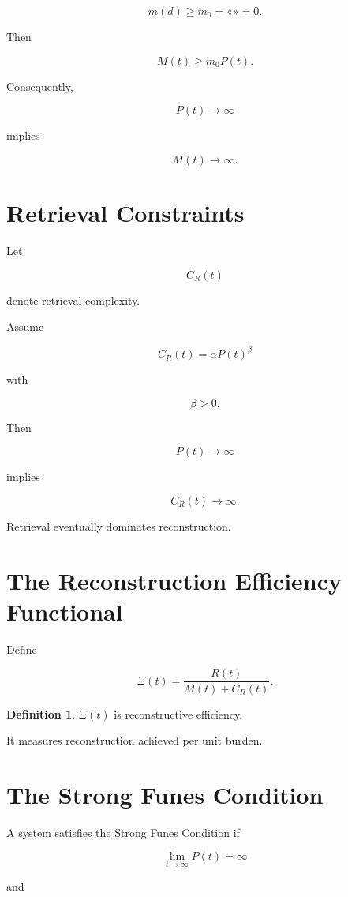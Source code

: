 \documentclass[12pt,oneside]{book}
\theoremstyle{plain} \newtheorem{theorem}{Theorem}[chapter] \newtheorem{lemma}[theorem]{Lemma} \newtheorem{proposition}[theorem]{Proposition} \newtheorem{corollary}[theorem]{Corollary}
\theoremstyle{definition} \newtheorem{definition}[theorem]{Definition} \newtheorem{axiom}[theorem]{Axiom} \newtheorem{construction}[theorem]{Construction}
\theoremstyle{remark} \newtheorem{remark}[theorem]{Remark} \newtheorem{example}[theorem]{Example}
\begin{document}
\[
m(d)
\ge
m_0
=
«»
=
0. 

\]

Then

\[
M(t)
\ge
m_0P(t).
\]

Consequently,

\[
P(t)
\rightarrow\infty
\]

implies

\[
M(t)
\rightarrow\infty.
\]

\section{Retrieval Constraints}

Let

\[
C_R(t)
\]

denote retrieval complexity.

Assume

\[
C_R(t)
=
\alpha
P(t)^\beta
\]

with

\[
\beta>0.
\]

Then

\[
P(t)
\rightarrow\infty
\]

implies

\[
C_R(t)
\rightarrow\infty.
\]

Retrieval eventually dominates reconstruction.

\section{The Reconstruction Efficiency Functional}

Define

\[
\Xi(t)
=
\frac{R(t)}
{M(t)+C_R(t)}.
\]

\begin{definition}

$\Xi(t)$ is reconstructive efficiency.

\end{definition}

It measures reconstruction achieved per unit burden.

\section{The Strong Funes Condition}

A system satisfies the Strong Funes Condition if

\[
\lim_{t\rightarrow\infty}
P(t)
=
\infty
\]

and
\end{document}
